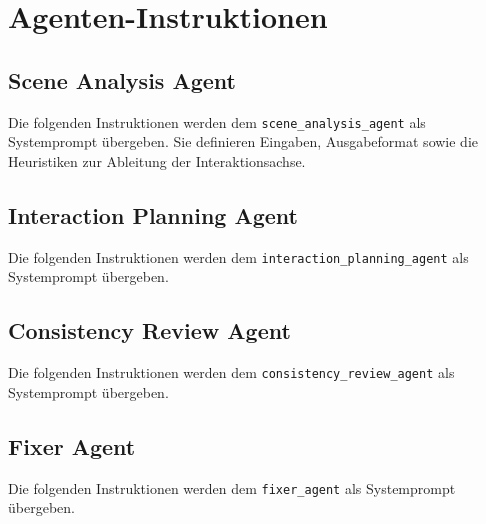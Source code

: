 \chapter{Agenten-Instruktionen}\label{ch:anhang_agenten_instruktionen}

\section{Scene Analysis Agent}\label{sec:anhang_scene_analysis_instructions}

Die folgenden Instruktionen werden dem \texttt{scene\_analysis\_agent} als Systemprompt übergeben.
Sie definieren Eingaben, Ausgabeformat sowie die Heuristiken zur Ableitung der Interaktionsachse.



\newpage
\section{Interaction Planning Agent}\label{sec:anhang_interaction_planning_instructions}

Die folgenden Instruktionen werden dem \texttt{interaction\_planning\_agent} als Systemprompt übergeben.



\newpage
\section{Consistency Review Agent}\label{sec:anhang_consistency_review_agent}

Die folgenden Instruktionen werden dem \texttt{consistency\_review\_agent} als Systemprompt übergeben.



\newpage
\section{Fixer Agent}\label{sec:anhang_fixer_agent}

Die folgenden Instruktionen werden dem \texttt{fixer\_agent} als Systemprompt übergeben.


